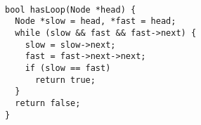 \begin{verbatim}

bool hasLoop(Node *head) {
  Node *slow = head, *fast = head;
  while (slow && fast && fast->next) {
    slow = slow->next;
    fast = fast->next->next;
    if (slow == fast)
      return true;
  }
  return false;
}
\end{verbatim}
